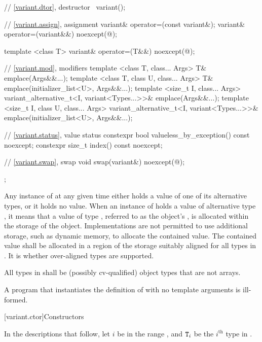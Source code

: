 \begin{codeblock}
{{      // \ref{variant.dtor}, destructor
      ~variant();

      // \ref{variant.assign}, assignment
      variant& operator=(const variant&);
      variant& operator=(variant&&) noexcept(@\seebelow@);

      template <class T> variant& operator=(T&&) noexcept(@\seebelow@);

      // \ref{variant.mod}, modifiers
      template <class T, class... Args>
        T& emplace(Args&&...);
      template <class T, class U, class... Args>
        T& emplace(initializer_list<U>, Args&&...);
      template <size_t I, class... Args>
        variant_alternative_t<I, variant<Types...>>& emplace(Args&&...);
      template <size_t I, class U, class... Args>
        variant_alternative_t<I, variant<Types...>>& emplace(initializer_list<U>, Args&&...);

      // \ref{variant.status}, value status
      constexpr bool valueless_by_exception() const noexcept;
      constexpr size_t index() const noexcept;

      // \ref{variant.swap}, swap
      void swap(variant&) noexcept(@\seebelow@);
    };
}
\end{codeblock}

\pnum
Any instance of  at any given time either holds a value
of one of its alternative types, or it holds no value.
When an instance of  holds a value of alternative type ,
it means that a value of type , referred to as the 
object's , is allocated within the storage of the
 object.
Implementations are not permitted to use additional storage, such as dynamic
memory, to allocate the contained value.
The contained value shall be allocated in a region of the 
storage suitably aligned for all types in .
It is 
whether over-aligned types are supported.

\pnum
All types in  shall be (possibly cv-qualified)
object types that are not arrays.

\pnum
A program that instantiates the definition of  with
no template arguments is ill-formed.

[variant.ctor]{Constructors}

\pnum
In the descriptions that follow, let $i$ be in the range ,
and $\texttt{T}_i$ be the $i^\text{th}$ type in .


